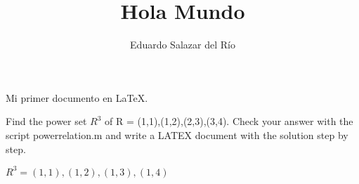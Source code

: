 \documentclass{article}
\title{Hola Mundo}
\author{Eduardo Salazar del Río}
\begin{document}

\maketitle

Mi primer documento en \LaTeX{}.

Find  the  power  set $R^3$ of R = {(1,1),(1,2),(2,3),(3,4)}. Check your answer with the script powerrelation.m and write a LATEX  document with the solution step by step.

$R^3={(1,1),(1,2),(1,3),(1,4)}$
\end{document}

